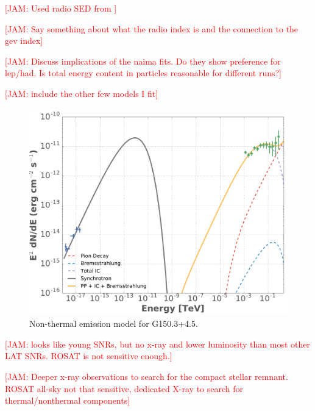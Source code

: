 \documentclass[iop]{emulateapj}
\newcommand{\kibitz}[2]{\ifnum\Comments=1\textcolor{#1}{#2}\fi}
\newcommand{\jamie}[1]{\kibitz{red}      {[JAM: #1]}}
\newcommand{\gam}{$\gamma$-ray}
\newcommand{\Gone}{G150.3+4.5}
\begin{document}
\jamie{Used radio SED from \citep{Gerbrandt14}}



\jamie{Say something about what the radio index is and the connection to the gev index}


\jamie{Discuss implications of the naima fits. Do they show preference for lep/had. Is total energy content in particles reasonable for different runs?}

\jamie{include the other few models I fit}



\begin{figure}[!ht]
	\begin{centering}
		\includegraphics[width=\columnwidth]{Figures/G150_ICsyncBremss_PP_SED.pdf}
		\caption[Non-thermal emission model for \Gone{}]{ Non-thermal emission model for \Gone{}. 
			\label{fig:naimaSED}}
	\end{centering}
\end{figure}


\jamie{looks like young SNRs, but no x-ray and lower luminosity than most other LAT SNRs. ROSAT is not sensitive enough.}

\jamie{Deeper x-ray observations to search for the compact stellar remnant. ROSAT all-sky not that sensitive, dedicated X-ray to search for thermal/nonthermal components}
\end{document}
